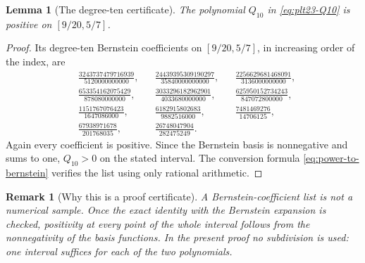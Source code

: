 \documentclass[11pt]{article}
\newtheorem{lemma}[theorem]{Lemma}
\newtheorem{remark}[theorem]{Remark}
\numberwithin{equation}{section}
\begin{document}
\begin{lemma}[The degree-ten certificate]\label{lem:bernstein-Q10}
  The polynomial $Q_{10}$ in \eqref{eq:plt23-Q10} is positive on $[9/20,5/7]$.
\end{lemma}

\begin{proof}
  Its degree-ten Bernstein coefficients on $[9/20,5/7]$, in increasing order of the index, are
  \begin{align*}
    &\frac{3243737479716939}{5120000000000},
    &&\frac{24439395309190297}{35840000000000},
    &&\frac{2256629681468091}{3136000000000},\\[1mm]
    &\frac{653354162075429}{878080000000},
    &&\frac{3033296182962901}{4033680000000},
    &&\frac{625950152734243}{847072800000},\\[1mm]
    &\frac{1151767076423}{1647086000},
    &&\frac{6182915802683}{9882516000},
    &&\frac{7481469276}{14706125},\\[1mm]
    &\frac{67938971678}{201768035},
    &&\frac{26748047904}{282475249}.
  \end{align*}
  Again every coefficient is positive.
  Since the Bernstein basis is nonnegative and sums to one, $Q_{10}>0$ on the stated interval.
  The conversion formula \eqref{eq:power-to-bernstein} verifies the list using only rational arithmetic.
\end{proof}

\begin{remark}[Why this is a proof certificate]
  A Bernstein-coefficient list is not a numerical sample.
  Once the exact identity with the Bernstein expansion is checked, positivity at every point of the whole interval follows from the nonnegativity of the basis functions.
  In the present proof no subdivision is used: one interval suffices for each of the two polynomials.
\end{remark}
\end{document}
